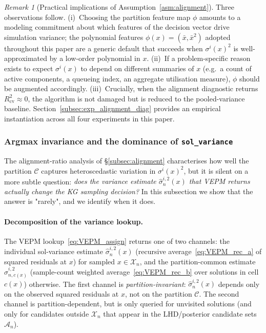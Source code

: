 \documentclass[12pt]{article}
\theoremstyle{plain}
\theoremstyle{definition}
\theoremstyle{remark}
\newtheorem{remark}{Remark}[section]
\begin{document}
\begin{remark}[Practical implications of Assumption~\ref{asm:alignment}]
\label{rem:alignment-practical}
Three observations follow.
(i)~Choosing the partition feature map $\phi$ amounts to a modeling
commitment about which features of the decision vector drive simulation
variance; the polynomial features $\phi(x)=(\bar x,\bar x^2)$ adopted
throughout this paper are a generic default that succeeds when
$\sigma^{i}(x)^{2}$ is well-approximated by a low-order polynomial in
$x$.
(ii)~If a problem-specific reason exists to expect $\sigma^{i}(x)$ to
depend on different summaries of $x$ (e.g.\ a count of active
components, a queueing index, an aggregate utilisation measure), $\phi$
should be augmented accordingly.
(iii)~Crucially, when the alignment diagnostic returns
$R^{2}_{\mathrm{cv}}\approx 0$, the algorithm is not damaged but is
reduced to the pooled-variance baseline.
Section~\ref{subsec:exp_alignment_diag} provides an empirical
instantiation across all four experiments in this paper.
\end{remark}


\subsubsection{Argmax invariance and the dominance of \texttt{sol\_variance}}
\label{subsec:argmax-invariance}

The alignment-ratio analysis of \S\ref{subsec:alignment} characterises
how well the partition $\mathcal{C}$ captures heteroscedastic variation
in $\sigma^{i}(x)^{2}$, but it is silent on a more subtle question:
\emph{does the variance estimate $\hat{\sigma}^{i,2}_n(x)$ that VEPM
returns actually change the KG sampling decision?}  In this subsection
we show that the answer is "rarely", and we identify when it does.

\paragraph{Decomposition of the variance lookup.}
The VEPM lookup~\eqref{eq:VEPM_assign} returns one of two channels:
the individual sol-variance estimate $\hat{\sigma}^{i,2}_n(x)$ (recursive
average~\eqref{eq:VEPM_rec_a} of squared residuals at $x$) for sampled
$x\in\mathcal{X}_n$, and the partition-common estimate
$\hat{\sigma}^{i,2}_{n,c(x)}$ (sample-count weighted average~\eqref{eq:VEPM_rec_b}
over solutions in cell $c(x)$) otherwise.  The first channel is
\emph{partition-invariant}: $\hat{\sigma}^{i,2}_n(x)$ depends only on
the observed squared residuals at $x$, not on the partition
$\mathcal{C}$.  The second channel is partition-dependent, but is only
queried for unvisited solutions (and only for candidates outside
$\mathcal{X}_n$ that appear in the LHD/posterior candidate sets
$\mathcal{A}_n$).
\end{document}
